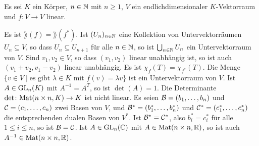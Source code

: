 \documentclass[a4paper,10pt]{exam}
\begin{document}
\begin{questions}
\question Es sei $K$ ein Körper, $n \in \mathbb{N}$ mit $n \geq 1$, $V$ ein endlichdimensionaler $K$-Vektorraum und $f \colon V \to V$ linear.
\begin{checkboxes}
 \choice
  Es ist $\rang(f) = \rang(f^*)$.
 \choice
  Ist $(U_n)_{n \in \mathbb{N}}$ eine Kollektion von Untervektorräumen $U_n \subseteq V$, so dass $U_n \subseteq U_{n+1}$ für alle $n \in \mathbb{N}$, so ist $\bigcup_{n \in \mathbb{N}} U_n$ ein Untervektorraum von $V$.
 \choice
  Sind $v_1, v_2 \in V$, so dass $(v_1, v_2)$ linear unabhängig ist, so ist auch $(v_1 + v_2, v_1 - v_2)$ linear unabhängig.
 \choice
  Es ist $\chi_f(T) = \chi_{f^*}(T)$.
 \choice
  Die Menge $\{v \in V \mid \text{es gibt $\lambda \in K$ mit $f(v) = \lambda v$}\}$ ist ein Untervektorraum von $V$.
 \choice
  Ist $A \in \mathrm{GL}_n(K)$ mit $A^{-1} = A^T$, so ist $\det(A) = 1$.
 \choice
  Die Determinante $\det \colon \mathrm{Mat}(n \times n, K) \to K$ ist nicht linear.
 \choice
  Es seien $\mathcal{B} = (b_1, \dotsc, b_n)$ und $\mathcal{C} = (c_1, \dotsc, c_n)$ zwei Basen von $V$, und $\mathcal{B}^* = (b_1^*, \dotsc, b_n^*)$ und $\mathcal{C}^* = (c_1^*, \dotsc, c_n^*)$ die entsprechenden dualen Basen von $V^*$. Ist $\mathcal{B}^* = \mathcal{C}^*$, also $b_i^* = c_i^*$ für alle $1 \leq i \leq n$, so ist $\mathcal{B} = \mathcal{C}$.
 \choice
  Ist $A \in \mathrm{GL}_n(\mathbb{C})$ mit $A \in \mathrm{Mat}(n \times n, \mathbb{R})$, so ist auch $A^{-1} \in \mathrm{Mat}(n \times n, \mathbb{R})$.
\end{checkboxes}








\end{questions}
\end{document}
